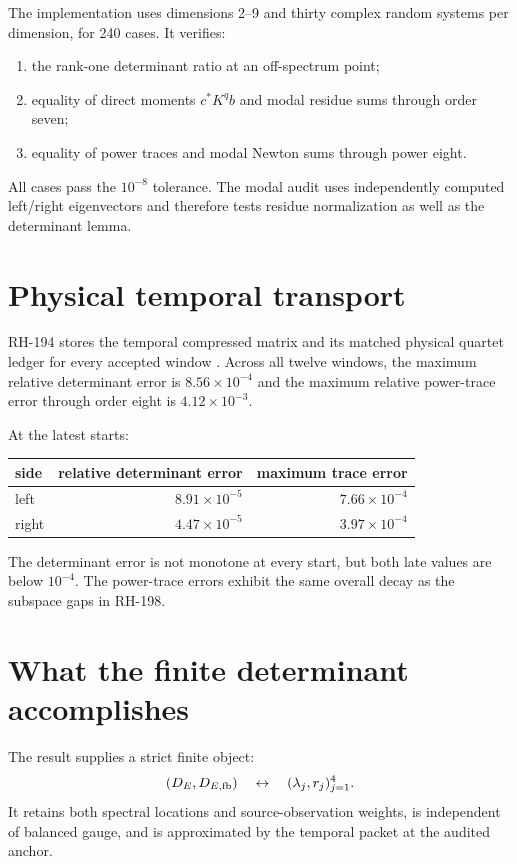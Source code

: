 \documentclass[12pt]{article}
\theoremstyle{remark}
\begin{document}
The implementation uses dimensions 2--9 and thirty complex random systems
per dimension, for 240 cases.  It verifies:
\begin{enumerate}[leftmargin=2em]
\item the rank-one determinant ratio at an off-spectrum point;
\item equality of direct moments $c^*K^qb$ and modal residue sums through
 order seven;
\item equality of power traces and modal Newton sums through power eight.
\end{enumerate}
All cases pass the $10^{-8}$ tolerance.  The modal audit uses independently
computed left/right eigenvectors and therefore tests residue normalization as
well as the determinant lemma.

\section{Physical temporal transport}

RH-194 stores the temporal compressed matrix and its matched physical quartet
ledger for every accepted window \citep{WangRH194}.  Across all twelve
windows, the maximum relative determinant error is
$8.56\times10^{-4}$ and the maximum relative power-trace error through order
eight is $4.12\times10^{-3}$.

At the latest starts:
\begin{center}
\begin{tabular}{lrr}
\toprule
side & relative determinant error & maximum trace error\\
\midrule
left & $8.91\times10^{-5}$ & $7.66\times10^{-4}$\\
right & $4.47\times10^{-5}$ & $3.97\times10^{-4}$\\
\bottomrule
\end{tabular}
\end{center}
The determinant error is not monotone at every start, but both late values
are below $10^{-4}$.  The power-trace errors exhibit the same overall decay
as the subspace gaps in RH-198.

\section{What the finite determinant accomplishes}

The result supplies a strict finite object:
\begin{equation*}
 (D_E,D_{E,\rm fb})
 \quad\leftrightarrow\quad
 (\lambda_j,r_j)_{j=1}^4.
\end{equation*}
It retains both spectral locations and source-observation weights, is
independent of balanced gauge, and is approximated by the temporal packet at
the audited anchor.
\end{document}

